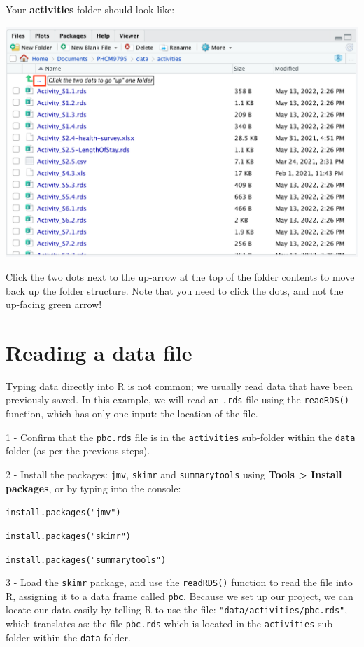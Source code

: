 \documentclass[
]{memoir}
\begin{document}
Your \textbf{activities} folder should look like:

\includegraphics[width=0.75\linewidth]{img/data-folder}

Click the two dots next to the up-arrow at the top of the folder contents to move back up the folder structure. Note that you need to click the dots, and not the up-facing green arrow!

\hypertarget{reading-a-data-file}{%
\section{Reading a data file}\label{reading-a-data-file}}

Typing data directly into R is not common; we usually read data that have been previously saved. In this example, we will read an \texttt{.rds} file using the \texttt{readRDS()} function, which has only one input: the location of the file.

1 - Confirm that the \texttt{pbc.rds} file is in the \texttt{activities} sub-folder within the \texttt{data} folder (as per the previous steps).

2 - Install the packages: \texttt{jmv}, \texttt{skimr} and \texttt{summarytools} using \textbf{Tools \textgreater{} Install packages}, or by typing into the console:

\texttt{install.packages("jmv")}

\texttt{install.packages("skimr")}

\texttt{install.packages("summarytools")}

3 - Load the \texttt{skimr} package, and use the \texttt{readRDS()} function to read the file into R, assigning it to a data frame called \texttt{pbc}. Because we set up our project, we can locate our data easily by telling R to use the file: \texttt{"data/activities/pbc.rds"}, which translates as: the file \texttt{pbc.rds} which is located in the \texttt{activities} sub-folder within the \texttt{data} folder.
\end{document}
